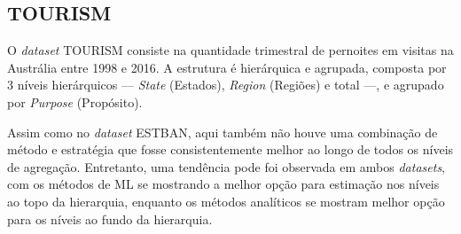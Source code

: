 \documentclass[
  12pt,
  twoside,
  openright,
  a4paper,
  chapter=TITLE,
  section=TITLE,
  brazil]{abntex2}
\begin{document}
\begin{table}

\caption{\label{tbl-estban-tempo-ml}Resultados Estban: Tempo de
processamento dos métodos de ML (em horas)}


\end{table}%

\subsection{TOURISM}\label{sec-tourism}

O \emph{dataset} TOURISM consiste na quantidade trimestral de pernoites
em visitas na Austrália entre 1998 e 2016. A estrutura é hierárquica e
agrupada, composta por 3 níveis hierárquicos --- \emph{State} (Estados),
\emph{Region} (Regiões) e total ---, e agrupado por \emph{Purpose}
(Propósito).

Assim como no \emph{dataset} ESTBAN, aqui também não houve uma
combinação de método e estratégia que fosse consistentemente melhor ao
longo de todos os níveis de agregação. Entretanto, uma tendência pode
foi observada em ambos \emph{datasets}, com os métodos de ML se
mostrando a melhor opção para estimação nos níveis ao topo da
hierarquia, enquanto os métodos analíticos se mostram melhor opção para
os níveis ao fundo da hierarquia.
\end{document}
